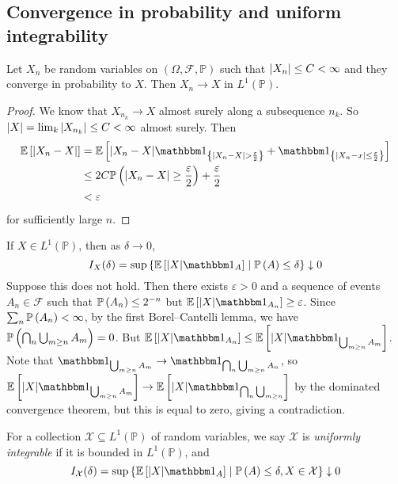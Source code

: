 \subsection{Convergence in probability and uniform integrability}
\begin{theorem}
	Let \( X_n \) be random variables on \( (\Omega, \mathcal F, \mathbb P) \) such that \( \abs{X_n} \leq C < \infty \) and they converge in probability to \( X \).
	Then \( X_n \to X \) in \( L^1(\mathbb P) \).
\end{theorem}
\begin{proof}
	We know that \( X_{n_k} \to X \) almost surely along a subsequence \( n_k \).
	So \( \abs{X} = \lim_k \abs{X_{n_k}} \leq C < \infty \) almost surely.
	Then
	\begin{align*}
		\expect{\abs{X_n - X}} &= \expect{\abs{X_n - X} \mathbbm 1_{\qty{\abs{X_n - X} > \frac \varepsilon 2}} + \mathbbm 1_{\qty{\abs{X_n - x} \leq \frac \varepsilon 2}}} \\
		&\leq 2 C \prob{\abs{X_n - X} \geq \frac{\varepsilon}{2}} + \frac \varepsilon 2 \\
		&< \varepsilon
	\end{align*}
	for sufficiently large \( n \).
\end{proof}
If \( X \in L^1(\mathbb P) \), then as \( \delta \to 0 \),
\[ I_X(\delta) = \sup \qty{ \expect{\abs{X} \mathbbm 1_A} \mid \prob{A} \leq \delta} \downarrow 0 \]
Suppose this does not hold.
Then there exists \( \varepsilon > 0 \) and a sequence of events \( A_n \in \mathcal F \) such that \( \mathbb{P}\left({A_n}\right) \leq 2^{-n} \) but \( \expect{\abs{X} \mathbbm 1_{A_n}} \geq \varepsilon \).
Since \( \sum_n \mathbb{P}\left({A_n}\right) < \infty \), by the first Borel--Cantelli lemma, we have \( \mathbb{P}\left({\bigcap_n \bigcup_{m \geq n} A_m}\right) = 0 \).
But \( \expect{\abs{X} \mathbbm 1_{A_n}} \leq \expect{\abs{X} \mathbbm 1_{\bigcup_{m \geq n} A_m}} \).
Note that \( \mathbbm 1_{\bigcup_{m \geq n} A_m} \to \mathbbm 1_{\bigcap_n \bigcup_{m \geq n} A_n} \), so \( \expect{\abs{X} \mathbbm 1_{\bigcup_{m \geq n} A_m}} \to \expect{\abs{X} \mathbbm 1_{\bigcap_n \bigcup_{m \geq n}}} \) by the dominated convergence theorem, but this is equal to zero, giving a contradiction.
\begin{definition}
	For a collection \( \mathcal X \subseteq L^1(\mathbb P) \) of random variables, we say \( \mathcal X \) is \emph{uniformly integrable} if it is bounded in \( L^1(\mathbb P) \), and
	\[ I_{\mathcal X}(\delta) = \sup \qty{ \expect{\abs{X}\mathbbm 1_A} \mid \prob{A} \leq \delta, X \in \mathcal X} \downarrow 0 \]
\end{definition}
